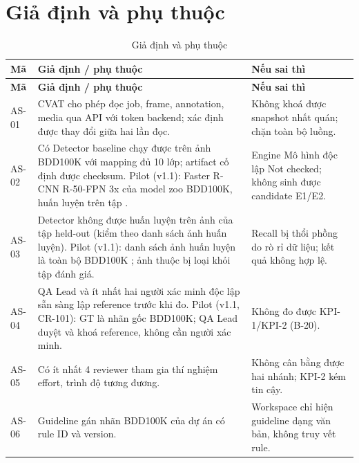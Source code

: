 \section{Giả định và phụ thuộc}
\label{sec:assumptions}
\begin{xltabular}{\linewidth}{@{}L{1.3cm}Y L{3.4cm}@{}}
\caption{Giả định và phụ thuộc}\label{tab:assumptions}\\
\toprule
\textbf{Mã} & \textbf{Giả định / phụ thuộc} & \textbf{Nếu sai thì}\\
\midrule
\endfirsthead
\toprule \textbf{Mã} & \textbf{Giả định / phụ thuộc} & \textbf{Nếu sai thì}\\ \midrule
\endhead
\bottomrule
\endfoot
AS-01 & CVAT cho phép đọc job, frame, annotation, media qua API với token backend; xác định được thay đổi giữa hai lần đọc. & Không khoá được snapshot nhất quán; chặn toàn bộ luồng.\\
AS-02 & Có Detector baseline chạy được trên ảnh BDD100K với mapping đủ 10 lớp; artifact cố định được checksum. Pilot (v1.1): Faster R-CNN R-50-FPN 3x của model zoo BDD100K, huấn luyện trên tập . & Engine Mô hình độc lập Not checked; không sinh được candidate E1/E2.\\
AS-03 & Detector không được huấn luyện trên ảnh của tập held-out (kiểm theo danh sách ảnh huấn luyện). Pilot (v1.1): danh sách ảnh huấn luyện là toàn bộ BDD100K ; ảnh thuộc  bị loại khỏi tập đánh giá. & Recall bị thổi phồng do rò rỉ dữ liệu; kết quả không hợp lệ.\\
AS-04 & QA Lead và ít nhất hai người xác minh độc lập sẵn sàng lập reference trước khi đo. Pilot (v1.1, CR-101): GT là nhãn gốc BDD100K; QA Lead duyệt và khoá reference, không cần người xác minh. & Không đo được KPI-1/KPI-2 (B-20).\\
AS-05 & Có ít nhất 4 reviewer tham gia thí nghiệm effort, trình độ tương đương. & Không cân bằng được hai nhánh; KPI-2 kém tin cậy.\\
AS-06 & Guideline gán nhãn BDD100K của dự án có rule ID và version. & Workspace chỉ hiện guideline dạng văn bản, không truy vết rule.\\
\end{xltabular}
